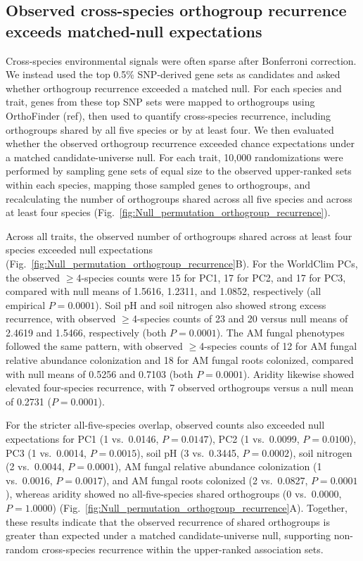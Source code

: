 \documentclass[unnumsec,webpdf,contemporary,large]{oup-authoring-template}%
\theoremstyle{thmstyleone}%
\theoremstyle{thmstyletwo}%
\theoremstyle{thmstylethree}%
\begin{document}


\subsection{Observed cross-species orthogroup recurrence exceeds matched-null expectations}

Cross-species environmental signals were often sparse after Bonferroni correction. We instead used the top 0.5\% SNP-derived gene sets as candidates and asked whether orthogroup recurrence exceeded a matched null. For each species and trait, genes from these top SNP sets were mapped to orthogroups using OrthoFinder (ref), then used to quantify cross-species recurrence, including orthogroups shared by all five species or by at least four. We then evaluated whether the observed orthogroup recurrence exceeded chance expectations under a matched candidate-universe null. For each trait, 10{,}000 randomizations were performed by sampling gene sets of equal size to the observed upper-ranked sets within each species, mapping those sampled genes to orthogroups, and recalculating the number of orthogroups shared across all five species and across at least four species (Fig.~\ref{fig:Null_permutation_orthogroup_recurrence}).

Across all traits, the observed number of orthogroups shared across at least four species exceeded null expectations (Fig.~\ref{fig:Null_permutation_orthogroup_recurrence}B). For the WorldClim PCs, the observed $\geq$4-species counts were 15 for PC1, 17 for PC2, and 17 for PC3, compared with null means of 1.5616, 1.2311, and 1.0852, respectively (all empirical $P = 0.0001$). Soil pH and soil nitrogen also showed strong excess recurrence, with observed $\geq$4-species counts of 23 and 20 versus null means of 2.4619 and 1.5466, respectively (both $P = 0.0001$). The AM fungal phenotypes followed the same pattern, with observed $\geq$4-species counts of 12 for AM fungal relative abundance colonization and 18 for AM fungal roots colonized, compared with null means of 0.5256 and 0.7103 (both $P = 0.0001$). Aridity likewise showed elevated four-species recurrence, with 7 observed orthogroups versus a null mean of 0.2731 ($P = 0.0001$).

For the stricter all-five-species overlap, observed counts also exceeded null expectations for PC1 (1 vs.\ 0.0146, $P = 0.0147$), PC2 (1 vs.\ 0.0099, $P = 0.0100$), PC3 (1 vs.\ 0.0014, $P = 0.0015$), soil pH (3 vs.\ 0.3445, $P = 0.0002$), soil nitrogen (2 vs.\ 0.0044, $P = 0.0001$), AM fungal relative abundance colonization (1 vs.\ 0.0016, $P = 0.0017$), and AM fungal roots colonized (2 vs.\ 0.0827, $P = 0.0001$), whereas aridity showed no all-five-species shared orthogroups (0 vs.\ 0.0000, $P = 1.0000$) (Fig.~\ref{fig:Null_permutation_orthogroup_recurrence}A). Together, these results indicate that the observed recurrence of shared orthogroups is greater than expected under a matched candidate-universe null, supporting non-random cross-species recurrence within the upper-ranked association sets.
\end{document}
